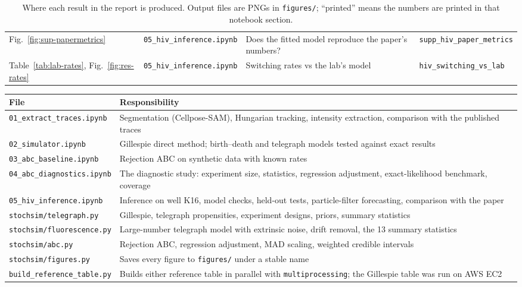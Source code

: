 \begin{table}[htbp]
\begin{tabular}{p{3.0cm}p{4.3cm}p{4.3cm}p{3.7cm}}
Fig.~\ref{fig:sup-papermetrics} & \texttt{05\_hiv\_inference.ipynb} & Does the fitted model reproduce the paper's numbers? & \texttt{supp\_hiv\_paper\_metrics} \\
Table~\ref{tab:lab-rates}, Fig.~\ref{fig:res-rates} & \texttt{05\_hiv\_inference.ipynb} & Switching rates vs the lab's model & \texttt{hiv\_switching\_vs\_lab} \\
\bottomrule
\end{tabular}
\caption{Where each result in the report is produced. Output files are PNGs in \texttt{figures/}; ``printed'' means the numbers are printed in that notebook section.}
\label{tab:reproduce}
\end{table}

\begin{table}[htbp]
\centering
\small
\begin{tabular}{p{4.3cm}p{10.2cm}}
\toprule
File & Responsibility \\
\midrule
\texttt{01\_extract\_traces.ipynb} & Segmentation (Cellpose-SAM), Hungarian tracking, intensity extraction, comparison with the published traces \\
\texttt{02\_simulator.ipynb} & Gillespie direct method; birth--death and telegraph models tested against exact results \\
\texttt{03\_abc\_baseline.ipynb} & Rejection ABC on synthetic data with known rates \\
\texttt{04\_abc\_diagnostics.ipynb} & The diagnostic study: experiment size, statistics, regression adjustment, exact-likelihood benchmark, coverage \\
\texttt{05\_hiv\_inference.ipynb} & Inference on well K16, model checks, held-out tests, particle-filter forecasting, comparison with the paper \\
\midrule
\texttt{stochsim/telegraph.py} & Gillespie, telegraph propensities, experiment designs, priors, summary statistics \\
\texttt{stochsim/fluorescence.py} & Large-number telegraph model with extrinsic noise, drift removal, the 13 summary statistics \\
\texttt{stochsim/abc.py} & Rejection ABC, regression adjustment, MAD scaling, weighted credible intervals \\
\texttt{stochsim/figures.py} & Saves every figure to \texttt{figures/} under a stable name \\
\texttt{build\_reference\_table.py} & Builds either reference table in parallel with \texttt{multiprocessing}; the Gillespie table was run on AWS EC2 \\

\end{tabular}
\end{table}
